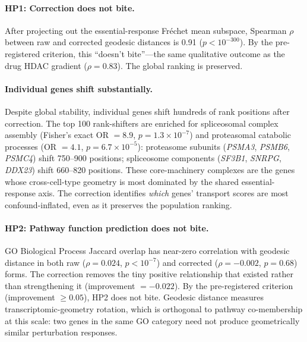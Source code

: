 \documentclass{article}
\begin{document}
\paragraph{HP1: Correction does not bite.}
After projecting out the essential-response Fr\'echet mean subspace,
Spearman $\rho$ between raw and corrected geodesic distances is 0.91 ($p <
10^{-300}$). By the pre-registered criterion, this ``doesn't bite''---the
same qualitative outcome as the drug HDAC gradient ($\rho = 0.83$).
The global ranking is preserved.

\paragraph{Individual genes shift substantially.}
Despite global stability, individual genes shift hundreds of rank positions
after correction. The top 100 rank-shifters are enriched for spliceosomal
complex assembly (Fisher's exact OR $= 8.9$, $p = 1.3 \times 10^{-7}$) and
proteasomal catabolic processes (OR $= 4.1$, $p = 6.7 \times 10^{-5}$):
proteasome subunits (\emph{PSMA3}, \emph{PSMB6}, \emph{PSMC4}) shift
750--900 positions; spliceosome components (\emph{SF3B1}, \emph{SNRPG},
\emph{DDX23}) shift 660--820 positions. These core-machinery complexes are
the genes whose cross-cell-type geometry is most dominated by the shared
essential-response axis. The correction identifies \emph{which} genes'
transport scores are most confound-inflated, even as it preserves the
population ranking.

\paragraph{HP2: Pathway function prediction does not bite.}
GO Biological Process Jaccard overlap has near-zero correlation with geodesic
distance in both raw ($\rho = 0.024$, $p < 10^{-7}$) and corrected ($\rho =
-0.002$, $p = 0.68$) forms. The correction removes the tiny positive
relationship that existed rather than strengthening it (improvement $=
-0.022$). By the pre-registered criterion (improvement $\geq 0.05$), HP2
does not bite. Geodesic distance measures transcriptomic-geometry rotation,
which is orthogonal to pathway co-membership at this scale: two genes in the
same GO category need not produce geometrically similar perturbation
responses.
\end{document}
